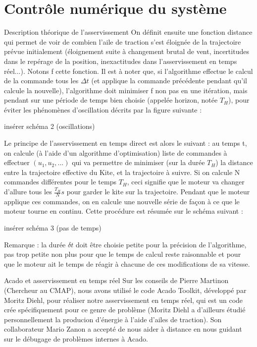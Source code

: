 \documentclass[a4paper,12pt]{article}
\newcounter{partie}
\newcounter{sous-partie}
\newenvironment{partie}[1]
{
\section{#1}
}
{

}
\newenvironment{sous-partie}[1]
{
\subsection{#1}
}
{

}
\begin{document}
\begin{partie}{Contrôle numérique du système}
\begin{sous-partie}{Description théorique de l'asservissement}
On définit ensuite une fonction distance qui permet de voir de combien l'aile de traction s'est éloignée de la trajectoire prévue initialement (éloignement suite à changement brutal de vent, incertitudes dans le repérage de la position, inexactitudes dans l'asservissement en temps réel...). Notons f cette fonction. Il est à noter que, si l'algorithme effectue le calcul de la commande tous les $\Delta t$ (et applique la commande précédente pendant qu'il calcule la nouvelle), l'algorithme doit minimiser f non pas en une itération, mais pendant sur  une période de temps bien choisie (appelée horizon, notée $T_H$), pour éviter les phénomènes d'oscillation décrits par la figure suivante : 
\newline
\begin{Huge}
insérer schéma 2 (oscillations)
\end{Huge}
\newline
Le principe de l'asservissement en temps direct est alors le suivant : au temps t, on calcule (à l'aide d'un algorithme d'optimisation) liste de commandes à effectuer $(u_1,u_2,...)$ qui va permettre de minimiser (sur la durée $T_H$) la distance entre la trajectoire effective du Kite, et la trajectoire à suivre. Si on calcule N commandes différentes pour le temps $T_H$, ceci signifie que le moteur va changer d'allure tous les $\frac{T_H}{N}s$ pour garder le kite sur la trajectoire. Pendant que le moteur applique ces commandes, on en calcule une nouvelle série de façon à ce que le moteur tourne en continu. Cette procédure est résumée sur le schéma suivant : 
\newline
\begin{huge}
insérer schéma 3 (pas de temps)
\end{huge}
Remarque : la durée $\delta t$ doit être choisie petite pour la précision de l'algorithme, pas trop petite non plus pour que le temps de calcul reste raisonnable et pour que le moteur ait le temps de réagir à chacune de ces modifications de sa vitesse.
\end{sous-partie}

\begin{sous-partie}{Acado et asservissement en temps réel}
Sur les conseils de Pierre Martinon (Chercheur au CMAP), nous avons utilisé le code Acado Toolkit, développé par Moritz Diehl, pour réaliser notre asservissement en temps réel, qui est un code crée spécifiquement pour ce genre de problème (Moritz Diehl a d'ailleurs étudié personnellement la producion d'énergie à l'aide d'ailes de traction).
Son collaborateur Mario Zanon a accepté de nous aider à distance en nous guidant sur le débugage de problèmes internes à Acado.


\end{sous-partie}
\end{partie}
\end{document}

